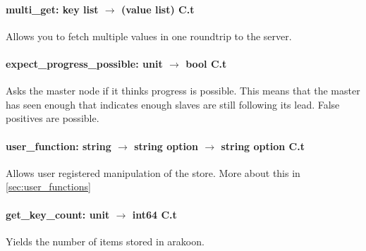 \paragraph{multi\_get: key list $\rightarrow$ (value list) C.t}
Allows you to fetch multiple values in one roundtrip to the server.

\paragraph{expect\_progress\_possible: unit $\rightarrow$ bool C.t}
Asks the master node if it thinks progress is possible. 
This means that the master has seen enough that indicates enough slaves are still following its lead. 
False positives are possible.

\paragraph{user\_function: string $\rightarrow$ 
  string option $\rightarrow$ 
  string option C.t}
Allows user registered manipulation of the store. 
More about this in \ref{sec:user_functions}

\paragraph{get\_key\_count: unit $\rightarrow$ int64 C.t}
Yields the number of items stored in arakoon.
